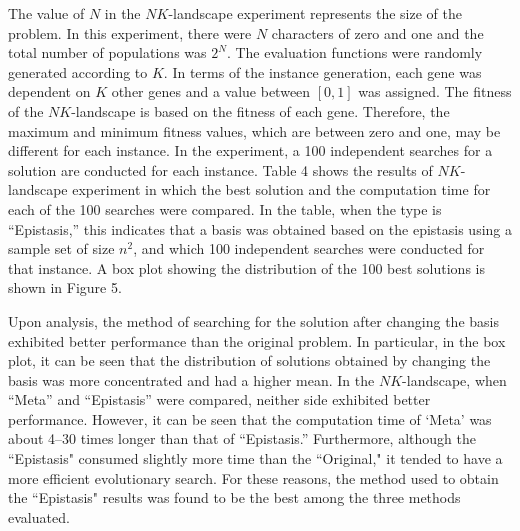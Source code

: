The value of $ N $ in the $ NK $-landscape experiment represents the size of the problem. In this experiment, there were $ N $ characters of zero and one and the total number of populations was $ 2^N $. The evaluation functions were randomly generated according to $ K $. In terms of the instance generation, each gene was dependent on $ K $ other genes and a value between $ \left[0,1\right] $ was assigned. The fitness of the $ NK $-landscape is based on the fitness of each gene. Therefore, the maximum and minimum fitness values, which are between zero and one, may be different for each instance. In the experiment, a 100 independent searches for a solution are conducted for each instance. Table 4 shows the results of $ NK $-landscape experiment in which the best solution and the computation time for each of the 100 searches were compared. In the table, when the type is “Epistasis,” this indicates that a basis was obtained based on the epistasis using a sample set of size $ n^2 $, and which 100 independent searches were conducted for that instance. A box plot showing the distribution of the 100 best solutions is shown in Figure 5.

Upon analysis, the method of searching for the solution after changing the basis exhibited better performance than the original problem. In particular, in the box plot, it can be seen that the distribution of solutions obtained by changing the basis was more concentrated and had a higher mean. In the $ NK $-landscape, when “Meta” and “Epistasis” were compared, neither side exhibited better performance. However, it can be seen that the computation time of ‘Meta’ was about 4–30 times longer than that of ``Epistasis.'' Furthermore, although the ``Epistasis" consumed slightly more time than the ``Original," it tended to have a more efficient evolutionary search. For these reasons, the method used to obtain the ``Epistasis" results was found to be the best among the three methods evaluated.


